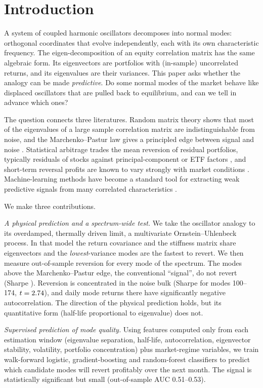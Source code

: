 \section{Introduction}

A system of coupled harmonic oscillators decomposes into normal modes:
orthogonal coordinates that evolve independently, each with its own
characteristic frequency. The eigen-decomposition of an equity
correlation matrix has the same algebraic form. Its eigenvectors are
portfolios with (in-sample) uncorrelated returns, and its eigenvalues
are their variances. This paper asks whether the analogy can be made
\emph{predictive}. Do some normal modes of the market behave like
displaced oscillators that are pulled back to equilibrium, and can we
tell in advance which ones?

The question connects three literatures. Random matrix theory shows
that most of the eigenvalues of a large sample correlation matrix are
indistinguishable from noise, and the Marchenko--Pastur law gives a
principled edge between signal and noise
\citep{laloux1999,plerou2002,bunbouchaud2017}. Statistical arbitrage
trades the mean reversion of residual portfolios, typically residuals
of stocks against principal-component or ETF factors
\citep{avellaneda2010,gatev2006}, and short-term reversal profits are
known to vary strongly with market conditions
\citep{lehmann1990,nagel2012,khandani2011}. Machine-learning methods
have become a standard tool for extracting weak predictive signals from
many correlated characteristics \citep{gu2020}.

We make three contributions.

\emph{A physical prediction and a spectrum-wide test.} We take the
oscillator analogy to its overdamped, thermally driven limit, a
multivariate Ornstein--Uhlenbeck process. In that model the return
covariance and the stiffness matrix share eigenvectors and the
\emph{lowest}-variance modes are the fastest to revert. We then measure
out-of-sample reversion for every mode of the spectrum. The modes above
the Marchenko--Pastur edge, the conventional ``signal'', do not revert
(Sharpe \SRSignalLevel). Reversion is concentrated in the noise bulk
(Sharpe \SRMiddleLevel{} for modes 100--174, $t=2.74$), and
daily mode returns there have significantly negative autocorrelation.
The direction of the physical prediction holds, but its quantitative
form (half-life proportional to eigenvalue) does not.

\emph{Supervised prediction of mode quality.} Using features computed
only from each estimation window (eigenvalue separation, half-life,
autocorrelation, eigenvector stability, volatility, portfolio
concentration) plus market-regime variables, we train walk-forward
logistic, gradient-boosting and random-forest classifiers to predict
which candidate modes will revert profitably over the next month. The
signal is statistically significant but small (out-of-sample AUC
0.51--0.53).

